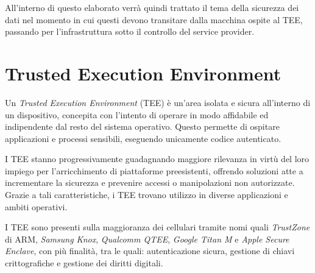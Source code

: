 \documentclass[12pt,italian]{report}
\begin{document}
	All'interno di questo elaborato verrà quindi trattato il tema della sicurezza dei dati nel momento in cui questi devono transitare dalla macchina ospite al TEE, passando per l'infrastruttura sotto il controllo del service provider.
	
	
	
	\chapter{Trusted Execution Environment}
	\label{cap:TEE}
	Un \textit{Trusted Execution Environment} (TEE) è un'area isolata e sicura all'interno di un dispositivo, concepita con l'intento di operare in modo affidabile ed indipendente dal resto del sistema operativo. Questo permette di ospitare applicazioni e processi sensibili, eseguendo unicamente codice autenticato.
	
	I TEE stanno progressivamente guadagnando maggiore rilevanza in virtù del loro impiego per l'arricchimento di piattaforme preesistenti, offrendo soluzioni atte a incrementare la sicurezza e prevenire accessi o manipolazioni non autorizzate. Grazie a tali caratteristiche, i TEE trovano utilizzo in diverse applicazioni e ambiti operativi.
	
	\bigbreak
	
	I TEE sono presenti sulla maggioranza dei cellulari tramite nomi quali \textit{TrustZone} di ARM, \textit{Samsung Knox}, \textit{Qualcomm QTEE}, \textit{Google Titan M} e \textit{Apple Secure Enclave}, con più finalità, tra le quali: autenticazione sicura, gestione di chiavi crittografiche e gestione dei diritti digitali.
	
\end{document}
